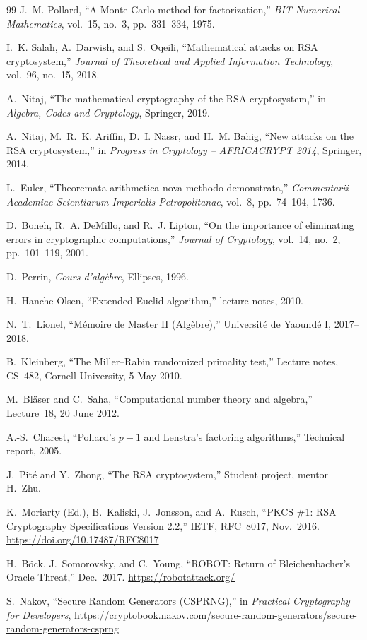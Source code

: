 \begin{thebibliography}{99}
J.~M. Pollard,
``A Monte Carlo method for factorization,''
\emph{BIT Numerical Mathematics}, vol.~15, no.~3, pp.~331--334, 1975.

I.~K. Salah, A.~Darwish, and S.~Oqeili,
``Mathematical attacks on RSA cryptosystem,''
\emph{Journal of Theoretical and Applied Information Technology}, vol.~96, no.~15, 2018.

A.~Nitaj,
``The mathematical cryptography of the RSA cryptosystem,''
in \emph{Algebra, Codes and Cryptology}, Springer, 2019.

A.~Nitaj, M.~R.~K. Ariffin, D.~I. Nassr, and H.~M. Bahig,
``New attacks on the RSA cryptosystem,''
in \emph{Progress in Cryptology -- AFRICACRYPT 2014}, Springer, 2014.

L.~Euler,
``Theoremata arithmetica nova methodo demonstrata,''
\emph{Commentarii Academiae Scientiarum Imperialis Petropolitanae}, vol.~8, pp.~74--104, 1736.

D.~Boneh, R.~A. DeMillo, and R.~J. Lipton,
``On the importance of eliminating errors in cryptographic computations,''
\emph{Journal of Cryptology}, vol.~14, no.~2, pp.~101--119, 2001.

D.~Perrin,
\emph{Cours d'algèbre},
Ellipses, 1996.

H.~Hanche-Olsen,
``Extended Euclid algorithm,'' lecture notes, 2010.

N.~T.~Lionel,
``Mémoire de Master II (Algèbre),''
Université de Yaoundé I, 2017--2018.

B.~Kleinberg,
``The Miller–Rabin randomized primality test,''
Lecture notes, CS~482, Cornell University, 5 May 2010.

M.~Bläser and C.~Saha,
``Computational number theory and algebra,''
Lecture~18, 20 June 2012.

A.-S.~Charest,
``Pollard's $p-1$ and Lenstra's factoring algorithms,''
Technical report, 2005.

J.~Pité and Y.~Zhong,
``The RSA cryptosystem,''
Student project, mentor H.~Zhu.

K.~Moriarty (Ed.), B.~Kaliski, J.~Jonsson, and A.~Rusch,
``PKCS \#1: RSA Cryptography Specifications Version 2.2,''
IETF, RFC~8017, Nov.~2016. \url{https://doi.org/10.17487/RFC8017}

H.~Böck, J.~Somorovsky, and C.~Young,
``ROBOT: Return of Bleichenbacher's Oracle Threat,''
Dec.~2017. \url{https://robotattack.org/}

S.~Nakov,
``Secure Random Generators (CSPRNG),''
in \emph{Practical Cryptography for Developers},
\url{https://cryptobook.nakov.com/secure-random-generators/secure-random-generators-csprng}

\end{thebibliography}